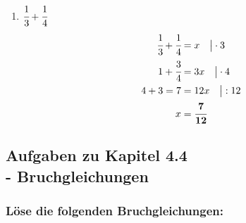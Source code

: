 \documentclass[a4paper,10pt]{article} %
\begin{document}
\begin{enumerate}[label=\alph*)]
  \item \(\cfrac{1}{3} + \cfrac{1}{4}\)
  \[
    \begin{aligned}
      \cfrac{1}{3} + \cfrac{1}{4} &= x \quad\big| \cdot 3 \\
      1 + \cfrac{3}{4} &= 3x \quad\big| \cdot 4 \\
      4 + 3 = 7 &= 12x \quad\big| : 12 \\
      x &= \mathbf{\cfrac{7}{12}}
    \end{aligned}
  \]

\end{enumerate}

\subsection{Aufgaben zu Kapitel 4.4 \\
  - Bruchgleichungen}

\subsubsection{Löse die folgenden Bruchgleichungen:} %
\end{document}
